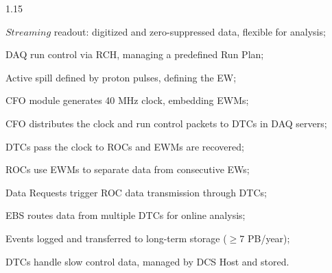 \documentclass{beamer}
\begin{document}
\begin{frame}
\vspace{-1.5mm}
\begin{columns}
    \begin{column}{1.15 \framewidth}
        \setlength{\leftmargini}{1.1em}
        \begin{itemize}
          {\footnotesize 
          \item $Streaming$ readout: digitized and zero-suppressed data, flexible for analysis; 
          \vspace{-0.5mm}
          \item DAQ run control via RCH, managing a 
          predefined Run Plan; 
          \vspace{-0.5mm}
          \item Active spill defined by proton pulses, defining the EW; 
          \vspace{-0.5mm}
          \item CFO module generates 40 MHz clock, embedding EWMs; 
          \vspace{-0.5mm}
          \item CFO distributes the clock and run control packets to DTCs in DAQ servers; 
          \vspace{-0.5mm}
          \item DTCs pass the clock to ROCs and EWMs are recovered; 
          \vspace{-0.5mm}
          \item ROCs use EWMs to separate data from consecutive EWs; 
          \vspace{-0.5mm} 
          \item Data Requests trigger ROC data transmission through DTCs;
        \vspace{-0.5mm} 
          \item EBS routes data from multiple DTCs for online analysis; 
        \vspace{-0.5mm} 
           \item Events logged and transferred to long-term storage ($\geq$7 PB/year); 
            \vspace{-0.5mm}
            \item DTCs handle slow control data, managed by DCS Host and stored.}
        \end{itemize}
    \end{column}
\end{columns}
\end{frame}
\end{document}
